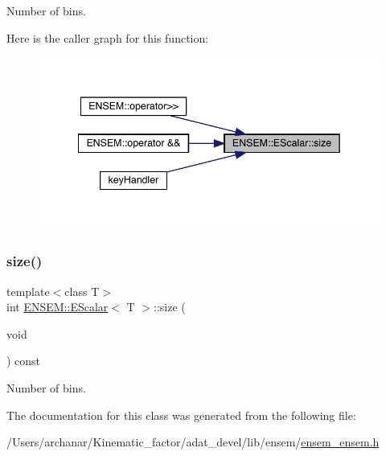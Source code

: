 Number of bins. 

Here is the caller graph for this function\+:\nopagebreak
\begin{figure}[H]
\begin{center}
\leavevmode
\includegraphics[width=342pt]{d0/d82/classENSEM_1_1EScalar_a314f162d71b15a8eb7e3382a274aa12b_icgraph}
\end{center}
\end{figure}
\mbox{\label{classENSEM_1_1EScalar_a314f162d71b15a8eb7e3382a274aa12b}} 
\subsubsection{\texorpdfstring{size()}{size()}\hspace{0.1cm}{\footnotesize\ttfamily [2/2]}}
{\footnotesize\ttfamily template$<$class T$>$ \\
int \mbox{\hyperlink{classENSEM_1_1EScalar}{E\+N\+S\+E\+M\+::\+E\+Scalar}}$<$ T $>$\+::size (\begin{DoxyParamCaption}\item[{void}]{ }\end{DoxyParamCaption}) const\hspace{0.3cm}{\ttfamily [inline]}}



Number of bins. 



The documentation for this class was generated from the following file\+:\begin{DoxyCompactItemize}
\item 
/\+Users/archanar/\+Kinematic\+\_\+factor/adat\+\_\+devel/lib/ensem/\mbox{\hyperlink{lib_2ensem_2ensem__ensem_8h}{ensem\+\_\+ensem.\+h}}\end{DoxyCompactItemize}
